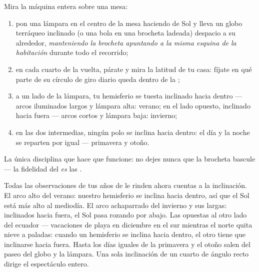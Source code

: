 \begin{method}\label{met:g6:sun-earth-moon:globe}
Mira la máquina entera sobre una mesa:
\begin{enumerate}
  \item pon una lámpara en el centro de la mesa haciendo de Sol y
        lleva un globo terráqueo inclinado (o una bola en una
        brocheta ladeada) despacio a su alrededor, \emph{manteniendo
        la brocheta apuntando a la misma esquina de la habitación}
        durante todo el recorrido;
  \item en cada cuarto de la vuelta, párate y mira la latitud de tu
        casa: fíjate en qué parte de su círculo de giro diario queda
        dentro de la ;
  \item a un lado de la lámpara, tu hemisferio se tuesta inclinado
        hacia dentro --- arcos iluminados largos y lámpara alta:
        verano; en el lado opuesto, inclinado hacia fuera --- arcos
        cortos y lámpara baja: invierno;
  \item en las dos  intermedias, ningún polo se inclina
        hacia dentro: el día y la noche se reparten por igual ---
        primavera y otoño.
\end{enumerate}
La única disciplina que hace que funcione: no dejes nunca que la
brocheta bascule --- la fidelidad del  \emph{es} las
.
\end{method}

\begin{example}\label{ex:g6:sun-earth-moon:clues}
Todas las observaciones de tus años de  le rinden ahora
cuentas a la inclinación. El arco alto del verano: nuestro hemisferio
se inclina hacia dentro, así que el Sol está más alto al mediodía. El
arco achaparrado del invierno y sus  largas: inclinados hacia
fuera, el Sol pasa rozando por abajo. Las  opuestas al
otro lado del ecuador --- vacaciones de playa en diciembre en el sur
mientras el norte quita nieve a paladas: cuando un hemisferio se
inclina hacia dentro, el otro tiene que inclinarse hacia fuera. Hasta
los días iguales de la primavera y el otoño salen del paseo del globo
y la lámpara. Una sola inclinación de un cuarto de ángulo recto
dirige el espectáculo entero.
\end{example}

